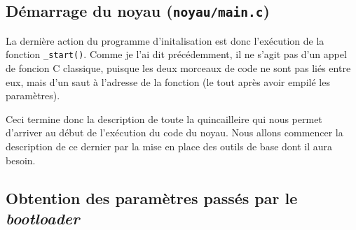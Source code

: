 %
\subsection{Démarrage du noyau ({\tt noyau/main.c})}

   La dernière action du programme d'initalisation est donc l'exécution
de la fonction \lstinline!_start()!. Comme je l'ai dit précédemment,
il ne s'agit pas d'un appel de foncion C classique, puisque les deux
morceaux de code ne sont pas liés entre eux, mais d'un saut à
l'adresse de la fonction (le tout après avoir empilé les paramètres).

   Ceci termine donc la description de toute la quincailleire qui nous
permet d'arriver au début de l'exécution du code du noyau. Nous allons
commencer la description de ce dernier par la mise en place des outils
de base dont il aura besoin.

%
\subsection{Obtention des paramètres passés par le {\em bootloader}}

